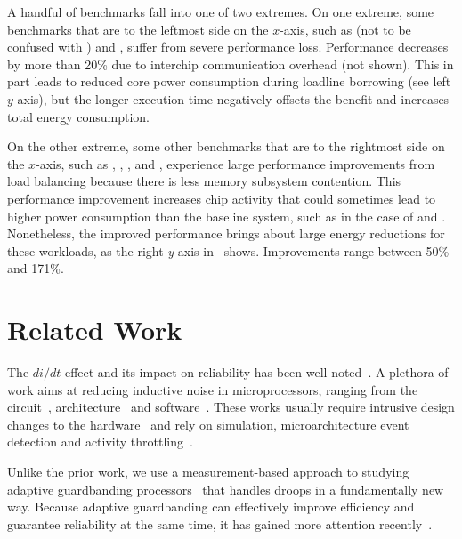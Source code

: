 A handful of benchmarks fall into one of two extremes. On one extreme, some benchmarks that are to the leftmost side on the $x$-axis, such as  (not to be confused with ) and , suffer from severe performance loss. Performance decreases by more than 20\% due to interchip communication overhead (not shown). This in part leads to reduced core power consumption during loadline borrowing (see left $y$-axis), but the longer execution time negatively offsets the benefit and increases total energy consumption. 

On the other extreme, some other benchmarks that are to the rightmost side on the $x$-axis, such as , , ,  and , experience large performance improvements from load balancing because there is less memory subsystem contention. This performance improvement increases chip activity that could sometimes lead to higher power consumption than the baseline system, such as in the case of  and . Nonetheless, the improved performance brings about large energy reductions for these workloads, as the right \textit{y}-axis in~ shows. Improvements range between 50\% and 171\%.

\section{Related Work}
\label{sec:voltage:related}

The $di/dt$ effect and its impact on reliability has been well noted~\cite{james2007comparison,reddi2010voltage,kim2012audit,bertran2014voltage}. A plethora of work aims at reducing inductive noise in microprocessors, ranging from the circuit~\cite{ernst2003razor,blaauw2008razorii}, architecture~\cite{grochowski2002microarchitectural,powell2003pipeline,gupta2007understanding,gupta2008decor,gupta2009event,reddi2009voltage,reddi2010voltage,miller2012vrsync,zhang2014architecture} and software~\cite{reddi2010eliminating}. These works usually require intrusive design changes to the hardware~\cite{ernst2003razor,blaauw2008razorii,gupta2008decor,reddi2009voltage} and rely on simulation, microarchitecture event detection and activity throttling~\cite{grochowski2002microarchitectural,powell2003pipeline,gupta2009event,reddi2009voltage,reddi2010eliminating,miller2012vrsync}.

Unlike the prior work, we use a measurement-based approach to studying adaptive guardbanding processors~\cite{fischer200590nm,tschanz2007adaptive,kurd2008next,lefurgy2011active,bowman201222nm} that handles droops in a fundamentally new way. Because adaptive guardbanding can effectively improve efficiency and guarantee reliability at the same time, it has gained more attention recently~\cite{grenat20145,tokunaga20145,bowman20158}.


